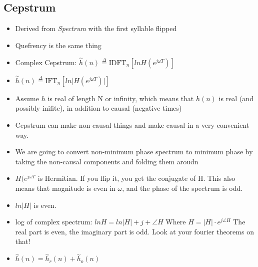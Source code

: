 \subsection*{Cepstrum}

\begin{itemize}
\item{Derived from \textit{Spectrum} with the first syllable flipped}
\item{Quefrency is the same thing}
\item{Complex Cepstrum: $
\stackrel{\sim}{h}(n) \stackrel{\Delta}{=} \mbox{IDFT}_n [ln H(e^{j\omega T})]
$}
\item{
$
\stackrel{\sim}{h}(n) \stackrel{\Delta}{=} \mbox{IFT}_n [ln 
\vert H(e^{j\omega T}) \vert ]
$
}
\item{Assume $h$ is real of length N or infinity, which means that
$h(n)$ is real (and possibly inifite)}, in addition to causal (negative times)
\item{
Cepstrum can make non-causal things and make causal in a very convenient way.
}
\item{
We are going to convert non-minimum phase spectrum to minimum phase by taking
the non-causal components and folding them aroudn
}
\item{
$H(e^{j\omega T}$ is Hermitian. If you flip it, you get the conjugate of H.
This also means that magnitude is even in $\omega$, and the phase
of the spectrum is odd. 
}
\item{
$ln \vert H \vert$ is even. 
}
\item{
log of complex spectrum: 
$ln H = ln \vert H \vert + j + \angle H
$
Where $H = \vert H \vert \cdot e^{j \angle H} $
The real part is even, the imaginary part is odd. Look at your fourier theorems
on that!
}
\item{
$
\stackrel{\sim}{h}(n) = \stackrel{\sim}{h}_r(n) + \stackrel{\sim}{h}_o(n) 
$
}
\end{itemize}
